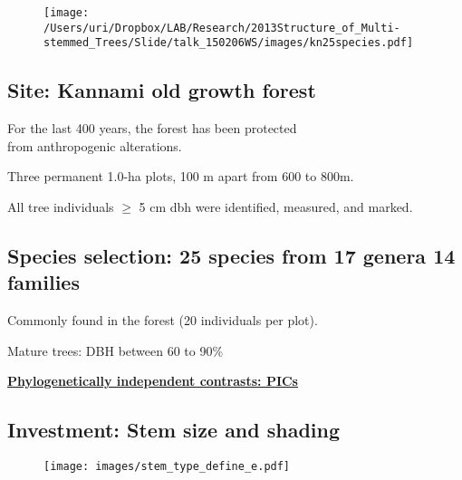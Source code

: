 \documentclass[a0, 25, plainboxedsections]{sciposter} %
\begin{document}
\begin{multicols}{2}

\begin{wrapfigure}{r}{16.7em}
  \centering
    \texttt{[image: /Users/uri/Dropbox/LAB/Research/2013Structure\_of\_Multi-stemmed\_Trees/Slide/talk\_150206WS/images/kn25species.pdf]} %
\end{wrapfigure}

\subsection*{Site: Kannami old growth forest}

\faCaretRight For the last 400 years, the forest has been protected\\ from anthropogenic alterations.

\faCaretRight Three permanent 1.0-ha plots, 100 m apart from 600 to 800m.

\faCaretRight All tree individuals $\geq$ 5 cm dbh were identified, measured, and marked.%

\subsection*{Species selection: 25 species from 17 genera 14 families}

\faCaretRight Commonly found in the forest (20 individuals per plot).

\faCaretRight Mature trees: DBH between 60 to 90\%

\faCaretRight \textbf{\underline{Phylogenetically independent contrasts: PICs}} %

\columnbreak
\subsection*{Investment: Stem size and shading}

\begin{figure}
  \centering
	\texttt{[image: images/stem\_type\_define\_e.pdf]}
\end{figure}


\end{multicols}
\end{document}
